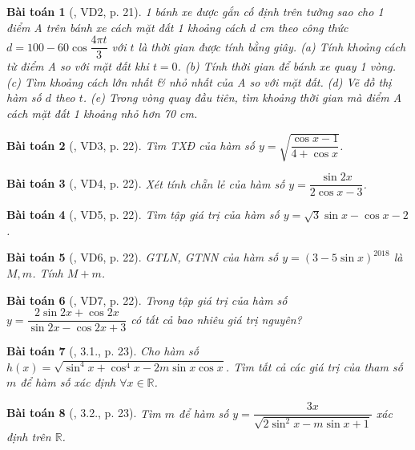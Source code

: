 \documentclass{article}
\newtheorem{baitoan}{Bài toán}
\begin{document}
\begin{baitoan}[\cite{Hung_nang_cao_phat_trien_Toan_11_tap_1}, VD2, p. 21]
	1 bánh xe được gắn cố định trên tường sao cho 1 điểm A trên bánh xe cách mặt đất 1 khoảng cách $d$ {\rm cm} theo công thức $d = 100 - 60\cos\dfrac{4\pi t}{3}$ với $t$ là thời gian được tính bằng giây. (a) Tính khoảng cách từ điểm A so với mặt đất khi $t = 0$. (b) Tính thời gian để bánh xe quay 1 vòng. (c) Tìm khoảng cách lớn nhất \& nhỏ nhất của A so với mặt đất. (d) Vẽ đồ thị hàm số $d$ theo $t$. (e) Trong vòng quay đầu tiên, tìm khoảng thời gian mà điểm A cách mặt đất 1 khoảng nhỏ hơn {\rm70 cm}.
\end{baitoan}

\begin{baitoan}[\cite{Hung_nang_cao_phat_trien_Toan_11_tap_1}, VD3, p. 22]
	Tìm {\rm TXĐ} của hàm số $y = \sqrt{\dfrac{\cos x - 1}{4 + \cos x}}$.
\end{baitoan}

\begin{baitoan}[\cite{Hung_nang_cao_phat_trien_Toan_11_tap_1}, VD4, p. 22]
	Xét tính chẵn lẻ của hàm số $y = \dfrac{\sin2x}{2\cos x - 3}$.
\end{baitoan}

\begin{baitoan}[\cite{Hung_nang_cao_phat_trien_Toan_11_tap_1}, VD5, p. 22]
	Tìm tập giá trị của hàm số $y = \sqrt{3}\sin x - \cos x - 2$.
\end{baitoan}

\begin{baitoan}[\cite{Hung_nang_cao_phat_trien_Toan_11_tap_1}, VD6, p. 22]
	{\rm GTLN, GTNN} của hàm số $y = (3 - 5\sin x)^{2018}$ là $M,m$. Tính $M + m$.
\end{baitoan}

\begin{baitoan}[\cite{Hung_nang_cao_phat_trien_Toan_11_tap_1}, VD7, p. 22]
	Trong tập giá trị của hàm số $y = \dfrac{2\sin2x + \cos2x}{\sin2x - \cos2x + 3}$ có tất cả bao nhiêu giá trị nguyên?
\end{baitoan}

\begin{baitoan}[\cite{Hung_nang_cao_phat_trien_Toan_11_tap_1}, 3.1., p. 23]
	Cho hàm số $h(x) = \sqrt{\sin^4x + \cos^4x - 2m\sin x\cos x}$. Tìm tất cả các giá trị của tham số $m$ để hàm số xác định $\forall x\in\mathbb{R}$.
\end{baitoan}

\begin{baitoan}[\cite{Hung_nang_cao_phat_trien_Toan_11_tap_1}, 3.2., p. 23]
	Tìm $m$ để hàm số $y = \dfrac{3x}{\sqrt{2\sin^2x - m\sin x + 1}}$ xác định trên $\mathbb{R}$.
\end{baitoan}
\end{document}
